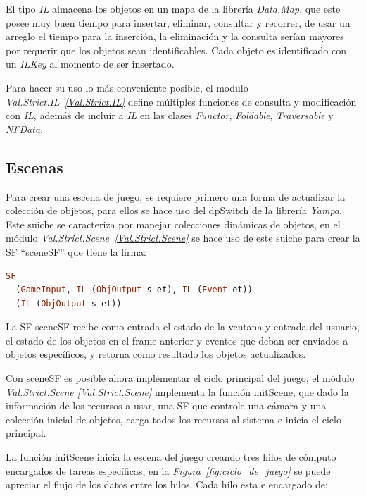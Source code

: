 El tipo \emph{IL} almacena los objetos en un mapa de la librería \emph{Data.Map}, que este posee muy buen tiempo para insertar, eliminar, consultar y recorrer, de usar un arreglo el tiempo para la inserción, la eliminación y la consulta serían mayores por requerir que los objetos sean identificables. Cada objeto es identificado con un \emph{ILKey} al momento de ser insertado.

Para hacer su uso lo más conveniente posible, el modulo \emph{Val.Strict.IL~\ref{Val.Strict.IL}} define múltiples funciones de consulta y modificación con \emph{IL}, además de incluir a \emph{IL} en las clases \emph{Functor}, \emph{Foldable}, \emph{Traversable} y \emph{NFData}.

\subsection{Escenas}
\label{sec:Escenas}

Para crear una escena de juego, se requiere primero una forma de actualizar la colección de objetos, para ellos se hace uso del dpSwitch de la librería \emph{Yampa}. Este suiche se caracteriza por manejar colecciones dinámicas de objetos, en el módulo \emph{Val.Strict.Scene~\ref{Val.Strict.Scene}} se hace uso de este suiche para crear la SF “sceneSF” que tiene la firma:

\begin{lstlisting}[frame=single,language=Haskell]
SF
  (GameInput, IL (ObjOutput s et), IL (Event et))
  (IL (ObjOutput s et))
\end{lstlisting}

La SF sceneSF recibe como entrada el estado de la ventana y entrada del usuario, el estado de los objetos en el frame anterior y eventos que deban ser enviados a objetos específicos, y retorna como resultado los objetos actualizados.

Con sceneSF es posible ahora implementar el ciclo principal del juego, el módulo \emph{Val.Strict.Scene \ref{Val.Strict.Scene}} implementa la función initScene, que dado la información de los recursos a usar, una SF que controle una cámara y una colección inicial de objetos, carga todos los recursos al sistema e inicia el ciclo principal.

La función initScene inicia la escena del juego creando tres hilos de cómputo encargados de tareas específicas, en la \emph{Figura~\ref{fig:ciclo_de_juego}} se puede apreciar el flujo de los datos entre los hilos. Cada hilo esta e
encargado de:

